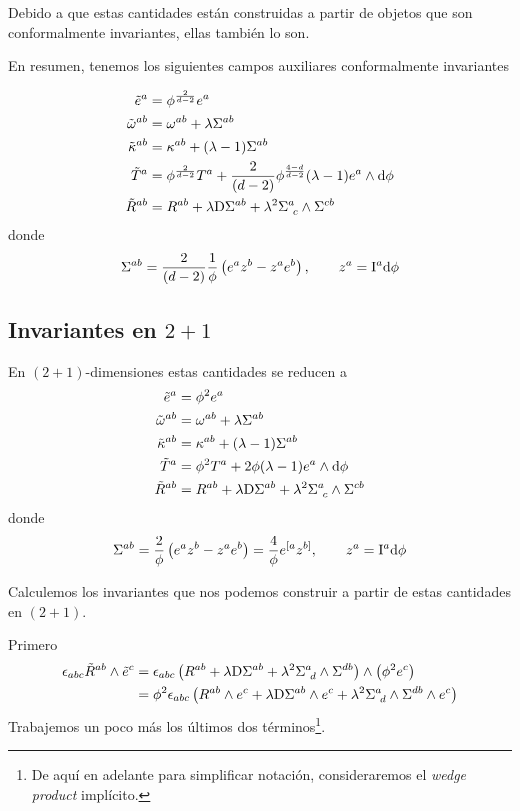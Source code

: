 Debido a que estas cantidades están construidas a partir de objetos que son conformalmente invariantes, ellas también lo son.

En resumen, tenemos los siguientes campos auxiliares conformalmente invariantes
\begin{tcolorbox}
\begin{align}
    \Tilde{e}^{a}&=\phi^\frac{2}{d-2} e^{a}\\
    \Tilde{\omega}^{ab}&=\omega^{ab}+\lambda\Sigma ^{ab}\\
    \Tilde{\kappa}^{ab}&=\kappa^{ab}+(\lambda-1)\Sigma ^{ab}\\
    \tilde{T}^{a}&=\phi^\frac{2}{d-2}T^{a}+\frac{2}{(d-2)}\phi^\frac{4-d}{d-2} (\lambda-1)e^{a}\wedge\dd\phi\\
    \Tilde{R}^{ab}&=R^{ab}+\lambda \mathrm{D} \Sigma^{ab}+\lambda^2\Sigma^{a}_{~c}\wedge\Sigma^{cb}
\end{align}
donde
\begin{align}
  \Sigma^{ab}=\frac{2}{(d-2)}\frac{1}{\phi}\left(e^{a}z^b-z^{a}e^b\right),\qquad z^{a}=\mathrm{I}^{a}\dd\phi
\end{align}
\end{tcolorbox}

\subsection{Invariantes en $2+1$}
En $(2+1)$-dimensiones estas cantidades se reducen a
\begin{align}
    \Tilde{e}^{a}&=\phi^2 e^{a}\\
    \Tilde{\omega}^{ab}&=\omega^{ab}+\lambda\Sigma ^{ab}\\
    \Tilde{\kappa}^{ab}&=\kappa^{ab}+(\lambda-1)\Sigma ^{ab}\\
    \tilde{T}^{a}&=\phi^2T^{a}+2\phi (\lambda-1)e^{a}\wedge\dd\phi\\
    \Tilde{R}^{ab}&=R^{ab}+\lambda \mathrm{D} \Sigma^{ab}+\lambda^2\Sigma^{a}_{~c}\wedge\Sigma^{cb}
\end{align}
donde
\begin{align}
  \Sigma^{ab}=\frac{2}{\phi}\left(e^{a}z^b-z^{a}e^b\right)=\frac{4}{\phi}e^{[a}z^{b]} ,\qquad z^{a}=\mathrm{I}^{a}\dd\phi
\end{align}


Calculemos los invariantes que nos podemos construir a partir de estas cantidades en $(2+1)$. 

Primero
\begin{align}
  \epsilon_{abc}\tilde{R}^{ab}\wedge \tilde{e}^c&=\epsilon_{abc}\left(R^{ab}+\lambda \mathrm{D} \Sigma^{ab}+\lambda^2 \Sigma^{a}_{~d}\wedge \Sigma^{db}\right)\wedge\left(\phi^2e^c\right)\\
  &=\phi^2\epsilon_{abc}\left(R^{ab}\wedge e^c+\lambda \mathrm{D} \Sigma^{ab}\wedge e^c+\lambda^2 \Sigma^{a}_{~d}\wedge \Sigma^{db}\wedge e^c\right)\label{inv}
\end{align}
Trabajemos un poco más los últimos dos términos\footnote{De aquí en adelante para simplificar notación, consideraremos el \textit{wedge product} implícito.}. 

